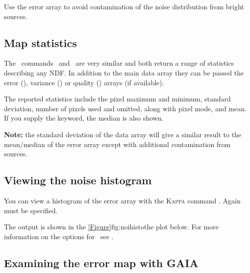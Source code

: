 \begin{tip}
  Use the error array to avoid contamination of the noise distribution
  from bright sources.
\end{tip}


\subsection{Map statistics}

The \Kappa\ commands \histat\ and \stats\ are very similar and both
return a range of statistics describing any NDF. In addition to the
main data array they can be passed the error (), variance
() or quality () arrays (if available).

The reported statistics include the pixel maximum and minimum,
standard deviation, number of pixels used and omitted, along with
pixel mode, and mean.  If you supply the  keyword,
the median is also shown.

\begin{terminalv}
\end{terminalv}

\textbf{Note:} the standard deviation of the data array will give a
similar result to the mean/median of the error array except with
additional contamination from sources.



\subsection{Viewing the noise histogram}

You can view a histogram of the error array with the
\textsc{Kappa} command \histogram. Again  must be
specified.

\begin{terminalv}
\end{terminalv}
The output is shown in the \cref{Figure}{fig:noihisto}{the plot below}.
For more information on the options for \histogram\ see
\kappasun.


\subsection{Examining the error map with GAIA}

